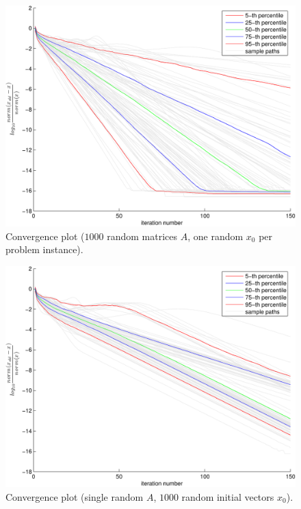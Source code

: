 \begin{figure}[htbp]
    \centering
    \includegraphics[width=\textwidth]{figures/convergenceBoxPlotDifferentA.pdf}
    \caption[Convergence rates: varying problem instances]{Convergence plot ($1000$ random matrices $A$, one random $x_0$ per problem instance).}
    \label{fig:qcqpConvVar}
\end{figure}

\begin{figure}[htbp]
    \centering
    \includegraphics[width=\textwidth]{figures/convergenceBoxPlotFixedA.pdf}
    \caption[Convergence rates: varying initial conditions]{Convergence plot (single random $A$, $1000$ random initial vectors $x_0$).}
    \label{fig:qcqpConvFix}
\end{figure}

